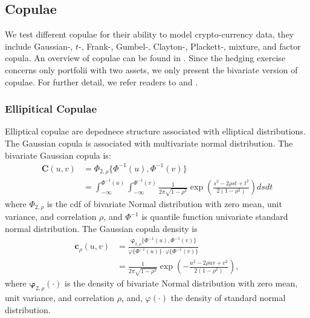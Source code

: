 
\subsection{Copulae}\label{subsec:copulae}
We test different copulae for their ability to model crypto-currency data,
they include Gaussian-, $t$-, Frank-, Gumbel-, Clayton-, Plackett-, mixture, and factor copula.
An overview of copulae can be found in \citet{hardle2010copulis}.
Since the hedging exercise concerns only portfolii with two assets, we only present the bivariate version of copulae.
For further detail, we refer readers to \citet{joe1997multivariate} and \citet{Nelsen1999}.
%
%

\subsubsection{Ellipitical Copulae}\label{sec:ellpitical-copulae}
Elliptical copulae are depednece structure associated with elliptical distributions.
The Gaussian copula is associated with multivariate normal distribution.
The bivariate Gaussian copula is:
    \begin{align}
        \bm{C}(u,v) &= \Phi_{2, \rho}\{\Phi^{-1}(u), \Phi^{-1}(v)\} \nonumber \\
                    &= \int_{-\infty}^{\Phi^{-1}(u)}
                       \int_{-\infty}^{\Phi^{-1}(v)}
                       \frac{1}{2\pi\sqrt{1-\rho^2}}
                       \exp{\left(
                       \frac{s^2-2\rho st+t^2}{2(1-\rho^2)}
                       \right)} ds dt
        \end{align}
where $\Phi_{2, \rho}$ is the cdf of bivariate Normal distribution with zero mean, unit variance, and correlation $\rho$,
and $\Phi^{-1}$ is quantile function univariate standard normal distribution.
The Gaussian copula density is
\begin{align}
    \bm{c}_\rho(u,v) &= \frac{\bm{\varphi}_{2,\rho}\{\Phi^{-1}(u), \Phi^{-1}(v)\}}
                        {\varphi\{\Phi^{-1}(u)\} \cdot \varphi\{\Phi^{-1}(v)\}} \nonumber \\
                &= \frac{1}{2\pi\sqrt{1-\rho^2}}\exp\left(
                   -\frac{u^2 - 2\rho uv + v^2}{2(1-\rho^2)}
                   \right),
    \end{align}
where $\bm{\varphi}_{2,\rho}(\cdot)$ is the density of bivariate Normal distribution with zero mean,
unit variance,
and correlation $\rho$,
and, $\varphi(\cdot)$ the density of standard normal distribution.\medskip

